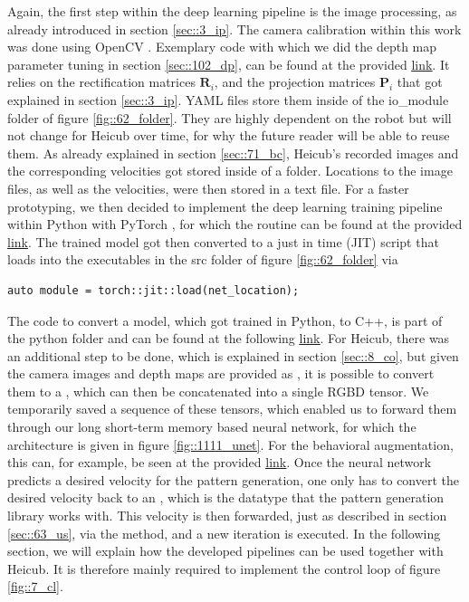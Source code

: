 Again, the first step within the deep learning pipeline is the image processing, as already introduced in section  \ref{sec::3_ip}. The camera calibration within this work was done using OpenCV \cite{opencv_library}. Exemplary code with which we did the depth map parameter tuning in section \ref{sec::102_dp}, can be found at the provided \href{https://github.com/mhubii/nmpc_pattern_generator/blob/master/src/tune_disp_map.cpp}{\underline{link}}. It relies on the rectification matrices $\bm{R}_i$, and the projection matrices $\bm{P}_i$ that got explained in section \ref{sec::3_ip}. YAML files store them inside of the io\_module folder of figure \ref{fig::62_folder}. They are highly dependent on the robot but will not change for Heicub over time, for why the future reader will be able to reuse them. As already explained in section \ref{sec::71_bc}, Heicub's recorded images and the corresponding velocities got stored inside of a folder. Locations to the image files, as well as the velocities, were then stored in a text file. For a faster prototyping, we then decided to implement the deep learning training pipeline within Python with PyTorch \cite{paszke2017automatic}, for which the routine can be found at the provided \href{https://github.com/mhubii/nmpc_pattern_generator/blob/master/libs/learning/python/train_rgbd.py}{\underline{link}}. The trained model got then converted to a just in time (JIT) script that loads into the executables in the src folder of figure \ref{fig::62_folder} via
\begin{verbatim}
auto module = torch::jit::load(net_location);
\end{verbatim}
The code to convert a model, which got trained in Python, to C++, is part of the python folder and can be found at the following \href{https://github.com/mhubii/nmpc_pattern_generator/blob/master/libs/learning/python/python_to_cpp.py}{\underline{link}}. For Heicub, there was an additional step to be done, which is explained in section \ref{sec::8_co}, but given the camera images and depth maps are provided as , it is possible to convert them to a , which can then be concatenated into a single RGBD tensor. We temporarily saved a sequence of these tensors, which enabled us to forward them through our long short-term memory based neural network, for which the architecture is given in figure \ref{fig::1111_unet}. For the behavioral augmentation, this can, for example, be seen at the provided \href{https://github.com/mhubii/nmpc_pattern_generator/blob/719fde0bb73925923de85cbf379c5523e075dfeb/src/behavioural_augmentation_real_robot_external_data.cpp#L625}{\underline{link}}. Once the neural network predicts a desired velocity for the pattern generation, one only has to convert the desired velocity back to an , which is the datatype that the pattern generation library works with. This velocity is then forwarded, just as described in section \ref{sec::63_us}, via the  method, and a new iteration is executed. In the following section, we will explain how the developed pipelines can be used together with Heicub. It is therefore mainly required to implement the control loop of figure \ref{fig::7_cl}. 